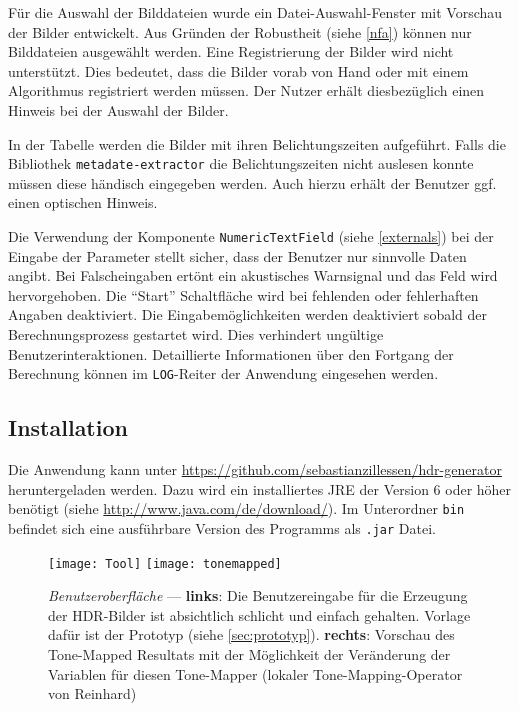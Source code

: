 Für die Auswahl der Bilddateien wurde ein Datei-Auswahl-Fenster mit Vorschau der Bilder entwickelt. Aus Gründen der Robustheit (siehe \autoref{nfa}) können nur Bilddateien ausgewählt werden.  Eine Registrierung der Bilder wird nicht unterstützt. Dies bedeutet, dass die Bilder vorab von Hand oder mit einem Algorithmus registriert werden müssen. Der Nutzer erhält diesbezüglich einen Hinweis bei der Auswahl der Bilder.

In der Tabelle werden die Bilder mit ihren Belichtungszeiten aufgeführt. Falls die Bibliothek \texttt{metadate-extractor} die Belichtungszeiten nicht auslesen konnte müssen diese händisch eingegeben werden. Auch hierzu erhält der Benutzer ggf. einen optischen Hinweis.

Die Verwendung der Komponente \texttt{NumericTextField} (siehe \autoref{externals}) bei der Eingabe der Parameter stellt sicher, dass der Benutzer nur sinnvolle Daten angibt. Bei Falscheingaben ertönt ein akustisches Warnsignal und das Feld wird hervorgehoben. Die \enquote{Start} Schaltfläche wird bei fehlenden oder fehlerhaften Angaben deaktiviert. Die Eingabemöglichkeiten werden deaktiviert sobald der Berechnungsprozess gestartet wird. Dies verhindert ungültige Benutzerinteraktionen. Detaillierte Informationen über den Fortgang der Berechnung können im \texttt{LOG}-Reiter der Anwendung eingesehen werden.

\subsection{Installation}

Die Anwendung kann unter \url{https://github.com/sebastianzillessen/hdr-generator} heruntergeladen werden. Dazu wird ein installiertes \gls{JRE} der Version 6 oder höher benötigt (siehe \url{http://www.java.com/de/download/}). Im Unterordner \texttt{bin} befindet sich eine ausführbare Version des Programms als \texttt{.jar} Datei.  

\begin{figure}
  \begin{center}
    \texttt{[image: Tool]}\hfill
    \texttt{[image: tonemapped]}
    \caption{\textit{Benutzeroberfläche} --- \textbf{links}: Die Benutzereingabe für die Erzeugung der HDR-Bilder ist absichtlich schlicht und einfach gehalten. Vorlage dafür ist der Prototyp (siehe \autoref{sec:prototyp}). \textbf{rechts}: Vorschau des Tone-Mapped Resultats mit der Möglichkeit der Veränderung der Variablen für diesen Tone-Mapper (lokaler \gls{Tone-Mapping}-Operator von Reinhard)}
    \label{fig:tool}
    \label{fig:app:tone}
  \end{center}
\end{figure}


